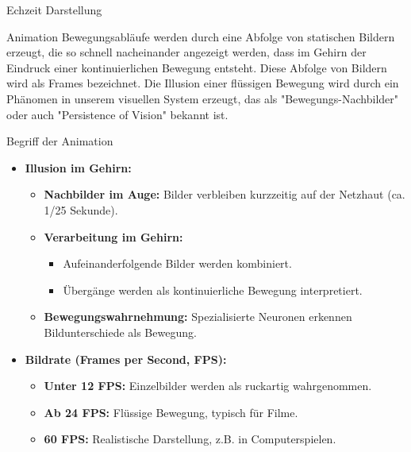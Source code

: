 \documentclass{beamer}
\begin{document}
  
  \begin{frame}{Echzeit Darstellung}
    \begin{block}{Animation}
   Bewegungsabläufe werden durch eine Abfolge von statischen Bildern erzeugt, die so schnell nacheinander angezeigt werden, dass im Gehirn der Eindruck einer kontinuierlichen Bewegung entsteht. 
    Diese Abfolge von Bildern wird als Frames bezeichnet. 
    Die Illusion einer flüssigen Bewegung wird durch ein Phänomen in unserem visuellen System erzeugt, das als "Bewegungs-Nachbilder" oder auch "Persistence of Vision" bekannt ist.
\end{block}
\end{frame}
  

\begin{frame}{Begriff der Animation}
    \begin{itemize}
      \item \textbf{Illusion im Gehirn:}
      \begin{itemize}
        \item \textbf{Nachbilder im Auge:} Bilder verbleiben kurzzeitig auf der Netzhaut (ca. 1/25 Sekunde).
        \item \textbf{Verarbeitung im Gehirn:} 
        \begin{itemize}
          \item Aufeinanderfolgende Bilder werden kombiniert.
          \item Übergänge werden als kontinuierliche Bewegung interpretiert.
        \end{itemize} 
        \item \textbf{Bewegungswahrnehmung:} Spezialisierte Neuronen erkennen Bildunterschiede als Bewegung.
      \end{itemize}
      \item \textbf{Bildrate (Frames per Second, FPS):}
      \begin{itemize}
        \item \textbf{Unter 12 FPS:} Einzelbilder werden als ruckartig wahrgenommen.
        \item \textbf{Ab 24 FPS:} Flüssige Bewegung, typisch für Filme.
        \item \textbf{60 FPS:} Realistische Darstellung, z.B. in Computerspielen.
      \end{itemize}
    \end{itemize}
  \end{frame}
  
\end{document}
